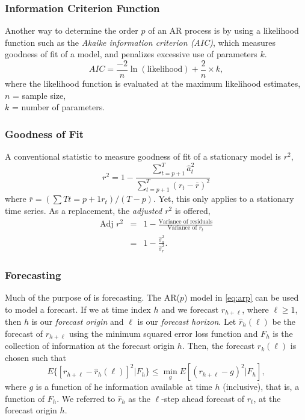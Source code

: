 \subsubsection{Information Criterion Function}
Another way to determine the order $p$ of an AR process is by using a likelihood function such as the \emph{Akaike information criterion (AIC)}, which measures goodness of fit of a model, and penalizes excessive use of parameters $k$.
\begin{equation}
AIC=\frac{-2}{n} \ln(\text{likelihood}) + \frac{2}{n} \times k,
\end{equation}
where the likelihood function is evaluated at the maximum likelihood estimates, \\
$n$ = sample size, \\
$k$ =  number of parameters.

\subsubsection{Goodness of Fit}
A conventional statistic to measure goodness of fit of a stationary model is $r^2$,
\begin{equation}
r^2 = 1 - \frac{\sum^T_{t=p+1}\hat{a}^2_t}{\sum^T_{t=p+1}(r_t-\bar{r})^2}
\end{equation}
where $\bar{r}= \left( \sum{T}{t=p+1} r_t\right) / (T-p)$. Yet, this only applies to a stationary time series. As a replacement, the \emph{adjusted $r^2$} is offered,
\begin{eqnarray*}
\text{Adj $r^2$} &=& 1 - \frac{\text{Variance of residuals}}{\text{Variance of $r_t$}} \\
&=& 1- \frac{\hat{\sigma}^2_a}{\hat{\sigma}^2_r}.
\end{eqnarray*}


\subsubsection{Forecasting}
Much of the purpose of \fts{} is forecasting. The AR($p$) model in \eqref{eq:arp} can be used to model a forecast. If we at time index $h$ and we forecast $r_{h+\ell}$, where $\ell \ge 1$, then $h$ is our \emph{forecast origin} and $\ell$ is our \emph{forecast horizon}. Let $\hat{r}_h(\ell)$ be the forecast of $r_{h+\ell}$ using the minimum squared error loss function and $F_h$ is the collection of information at the forecast origin $h$. Then, the forecast $\hat{r}_k(\ell)$ is chosen such that
\[
E\{[r_{h+\ell} - \hat{r}_h(\ell)]^2 | F_h \} \le \min_g E[(r_{h+\ell}-g)^2 | F_h],
\]
where $g$ is a function of he information available at time $h$ (inclusive), that is, a function of $F_h$. We referred to $\hat{r}_h$ as the $\ell$-step ahead forecast of $r_t$, at the forecast origin $h$.

